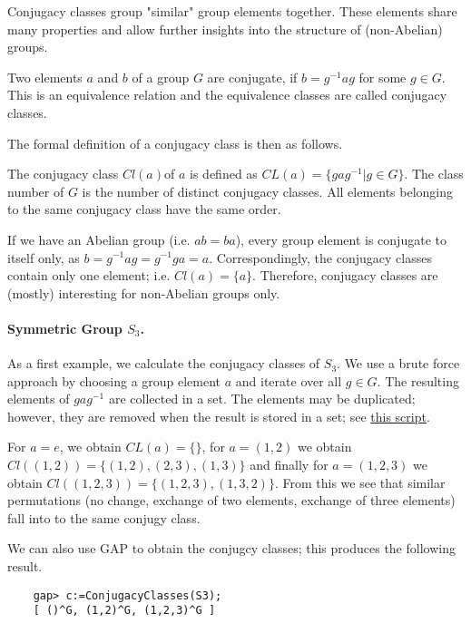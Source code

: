 
Conjugacy classes group "similar" group elements together. These elements share many properties and allow further insights into the structure of (non-Abelian) groups.

\begin{definition}
    Two elements $a$ and $b$ of a group $G$ are conjugate, if $b = g^{-1}ag$ for some $g \in G$. This is an equivalence relation and the equivalence classes are called conjugacy classes.    
\end{definition}

The formal definition of a conjugacy class is then as follows.

\begin{definition}
    The conjugacy class $Cl(a)$of $a$ is defined as $CL(a) = \{gag^{-1} | g \in G\}$. The class number of $G$ is the number of distinct conjugacy classes. All elements belonging to the same conjugacy class have the same order.
\end{definition}

If we have an Abelian group (i.e. $ab = ba$), every group element is conjugate to itself only, as $b = g^{-1}ag = g^{-1}ga = a$. Correspondingly, the conjugacy classes contain only one element; i.e. $Cl(a) = \{a\}$. Therefore, conjugacy classes are (mostly) interesting for non-Abelian groups only.

\paragraph{Symmetric Group $S_3$.} As a first example, we calculate the conjugacy classes of $S_3$. We use a brute force approach by choosing a group element $a$ and iterate over all $g \in G$. The resulting elements of $gag^{-1}$ are collected in a set. The elements may be duplicated; however, they are removed when the result is stored in a set; see \href{file/gap_conjugcy_classes.gp}{this script}.

For $a = e$, we obtain $CL(a) = \{\}$, for $a = (1,2)$ we obtain $Cl((1,2)) = \{(1,2), (2,3), (1,3)\}$ and finally for $a = (1,2,3)$ we obtain $Cl((1,2,3)) = \{(1,2,3), (1,3,2)\}$. From this we see that similar permutations (no change, exchange of two elements, exchange of three elements) fall into to the same conjugy class.

We can also use GAP to obtain the conjugcy classes; this produces the following result.

\begin{verbatim}
    gap> c:=ConjugacyClasses(S3);
    [ ()^G, (1,2)^G, (1,2,3)^G ]
\end{verbatim}

